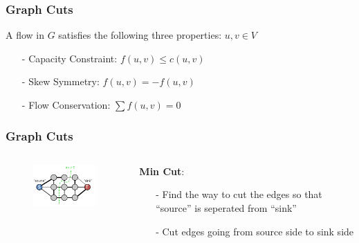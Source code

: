 \documentclass[notheorems,mathserif,table,compress]{beamer}  %
\begin{document}
\begin{frame}
\frametitle{Graph Cuts}
 A flow in $G$ satisfies the following three properties: $u,v \in V$
	\begin{itemize}
	\item[-] {\color{blue} Capacity Constraint}:  $f(u,v)\leq c(u,v)$ \\
	\item[-] {\color{blue} Skew Symmetry}: $f(u,v) = -f(u,v)$   \\
	\item[-] {\color{blue} Flow Conservation}: $ \sum f(u,v) = 0$ \\
	\end{itemize}
\end{frame}



\begin{frame}
\frametitle{Graph Cuts}
\begin{columns}
\begin{column}[c]{0.5\textwidth}
       \begin{figure}[!ht]
       \centering
       \includegraphics[width=1.9in]{maxflow2.png}
       \end{figure}
\end{column}

\begin{column}[c]{0.5\textwidth}
\textbf{Min Cut}:
\begin{itemize}
\item[-] Find the way to cut the edges so that ``source'' is seperated from ``sink''
\item[-] Cut edges going from source side to sink side
\end{itemize}
      \end{column}
 \end{columns}  
\end{frame}
\end{document}
